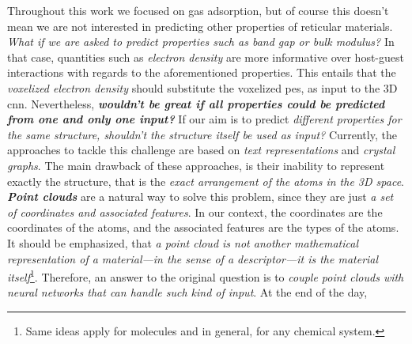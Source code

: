 Throughout this work we focused on gas adsorption, but of course this doesn't
mean we are not interested in predicting other properties of reticular
materials. \emph{What if we are asked to predict
properties such as band gap or bulk modulus?} In that case, quantities such as
\emph{electron density} are more informative over
host-guest interactions with regards to the
aforementioned properties. This entails that the \emph{voxelized electron
density} should substitute the voxelized
\gls{pes}, as input to the 3D \gls{cnn}. Nevertheless, \emph{\textbf{wouldn't be
great if all properties could be predicted from one and only one input?}} If our
aim is to predict \emph{different properties for the same structure, shouldn't
the structure itself be used as input?} Currently, the approaches to tackle this
challenge are based on \emph{text representations}
and \emph{crystal graphs}. The main drawback of these
approaches, is their inability to represent exactly the structure, that is the
\emph{exact arrangement of the atoms in the 3D space}. \emph{\textbf{Point
clouds}} are a natural way to solve this problem, since they are just \emph{a
set of coordinates and associated features}. In our context,
the coordinates are the coordinates of the atoms, and the associated features
are the types of the atoms. It should be emphasized, that \emph{a point cloud is
not another mathematical representation of a material---in
the sense of a descriptor---it is the material
itself}\footnote{Same ideas apply for molecules and in general, for any chemical
system.}. Therefore, an answer to the original question
is to \emph{couple point clouds with neural networks that can handle such kind
of input}. At the end of the day, 
